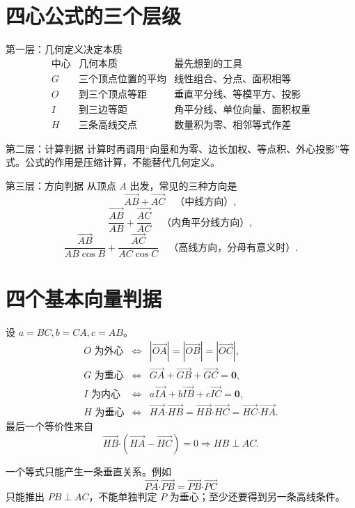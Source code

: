 \documentclass[11pt,a4paper,openany]{ctexbook}
\newcommand{\vect}[1]{\overrightarrow{#1}}
\newcommand{\vv}[1]{\bm{#1}}
\newcommand{\dotp}{\mathbin{\boldsymbol\cdot}}
\begin{document}
\section{四心公式的三个层级}
\begin{summarybox}{第一层：几何定义决定本质}
\[
\begin{array}{c|c|c}
\text{中心}&\text{几何本质}&\text{最先想到的工具}\\ \hline
G&\text{三个顶点位置的平均}&\text{线性组合、分点、面积相等}\\
O&\text{到三个顶点等距}&\text{垂直平分线、等模平方、投影}\\
I&\text{到三边等距}&\text{角平分线、单位向量、面积权重}\\
H&\text{三条高线交点}&\text{数量积为零、相邻等式作差}
\end{array}
\]
\end{summarybox}

\begin{summarybox}{第二层：计算判据}
计算时再调用“向量和为零、边长加权、等点积、外心投影”等式。公式的作用是压缩计算，不能替代几何定义。
\end{summarybox}

\begin{summarybox}{第三层：方向判据}
从顶点 \(A\) 出发，常见的三种方向是
\[
\vect{AB}+\vect{AC}\quad\text{（中线方向）},
\]
\[
\frac{\vect{AB}}{AB}+\frac{\vect{AC}}{AC}\quad\text{（内角平分线方向）},
\]
\[
\frac{\vect{AB}}{AB\cos B}+\frac{\vect{AC}}{AC\cos C}
\quad\text{（高线方向，分母有意义时）}.
\]
\end{summarybox}

\section{四个基本向量判据}
设 \(a=BC,b=CA,c=AB\)。
\[
\begin{array}{rcl}
O\text{ 为外心}&\Longleftrightarrow&|\vect{OA}|=|\vect{OB}|=|\vect{OC}|,\\[1mm]
G\text{ 为重心}&\Longleftrightarrow&\vect{GA}+\vect{GB}+\vect{GC}=\vv0,\\[1mm]
I\text{ 为内心}&\Longleftrightarrow&a\vect{IA}+b\vect{IB}+c\vect{IC}=\vv0,\\[1mm]
H\text{ 为垂心}&\Longleftrightarrow&
\vect{HA}\dotp\vect{HB}=\vect{HB}\dotp\vect{HC}=\vect{HC}\dotp\vect{HA}.
\end{array}
\]
最后一个等价性来自
\[
\vect{HB}\dotp(\vect{HA}-\vect{HC})=0
\Longrightarrow HB\perp AC.
\]

\begin{warningbox}
一个等式只能产生一条垂直关系。例如
\[
\vect{PA}\dotp\vect{PB}=\vect{PB}\dotp\vect{PC}
\]
只能推出 \(PB\perp AC\)，不能单独判定 \(P\) 为垂心；至少还要得到另一条高线条件。
\end{warningbox}
\end{document}
